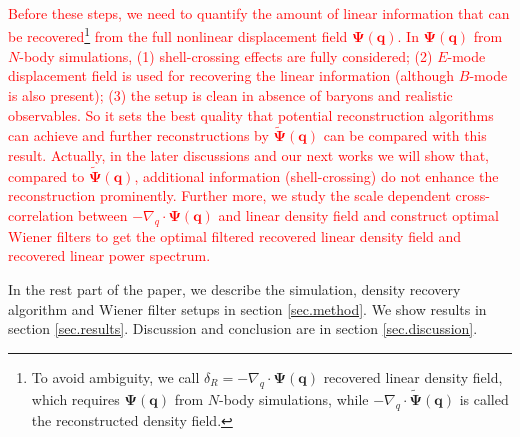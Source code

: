 \documentclass[aps,prd,twocolumn,superscriptaddress,amsfont,amssymb,amsmath,nofootinbib,showpacs,balancelastpage]{revtex4-1}
\newcommand{\bs}{\boldsymbol}
\newcommand{\tcr}{\textcolor{red}}
\begin{document}
\tcr{Before these steps, we need to quantify the amount of linear information
that can be recovered\footnote{To avoid ambiguity, we call
$\delta_R=-\nabla_q\cdot\bs\Psi(\bs q)$ recovered linear density field, which
requires $\bs\Psi(\bs q)$ from $N$-body simulations, while
$-\nabla_q\cdot\tilde{\bs \Psi}(\bs q)$ is called the
reconstructed density field.}
 from the full nonlinear displacement field $\bs\Psi(\bs q)$.
In $\bs\Psi(\bs q)$ from $N$-body simulations,
(1) shell-crossing effects are fully considered; (2) $E$-mode displacement
field is used for recovering the linear information (although $B$-mode is
also present); (3) the setup is clean in absence of baryons and realistic
observables. So it sets the best quality that potential reconstruction
algorithms can achieve and further reconstructions by $\tilde{\bs \Psi}(\bs q)$
can be compared with this result. Actually, in the later discussions and
our next works we will show that, compared to $\tilde{\bs \Psi}(\bs q)$,
additional information (shell-crossing) do not enhance the reconstruction
prominently. Further more, we study the scale dependent cross-correlation
between $-\nabla_q\cdot\bs\Psi(\bs q)$ and linear density field
and construct optimal Wiener filters to get the optimal filtered
recovered linear density field and recovered linear power spectrum.}

In the rest part of the paper, we describe the simulation,
density recovery algorithm and Wiener filter setups in section
\ref{sec.method}. We show results in section \ref{sec.results}.
Discussion and conclusion are in section \ref{sec.discussion}.
\end{document}
